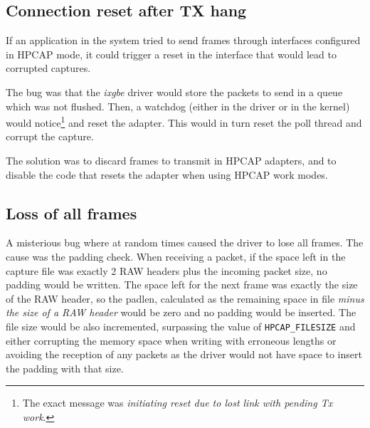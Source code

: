 \subsection{Connection reset after TX hang}

\begin{bugdata}
\end{bugdata}

If an application in the system tried to send frames through interfaces configured in HPCAP mode, it could trigger a reset in the interface that would lead to corrupted captures.

The bug was that the \textit{ixgbe} driver would store the packets to send in a queue which was not flushed. Then, a watchdog (either in the driver or in the kernel) would notice\footnote{The exact message was \textit{initiating reset due to lost link with pending Tx work}.} and reset the adapter. This would in turn reset the poll thread and corrupt the capture.

The solution was to discard frames to transmit in HPCAP adapters, and to disable the code that resets the adapter when using HPCAP work modes.

\subsection{Loss of all frames}
\label{sec:bugs:AllFramesLost}

\begin{bugdata}
\end{bugdata}

A misterious bug where at random times caused the driver to lose all frames. The cause was the padding check. When receiving a packet, if the space left in the capture file was exactly 2 RAW headers plus the incoming packet size, no padding would be written. The space left for the next frame was exactly the size of the RAW header, so the padlen, calculated as the remaining space in file \textit{minus the size of a RAW header} would be zero and no padding would be inserted. The file size would be also incremented, surpassing the value of \texttt{HPCAP\_FILESIZE} and either corrupting the memory space when writing with erroneous lengths or avoiding the reception of any packets as the driver would not have space to insert the padding with that size.

